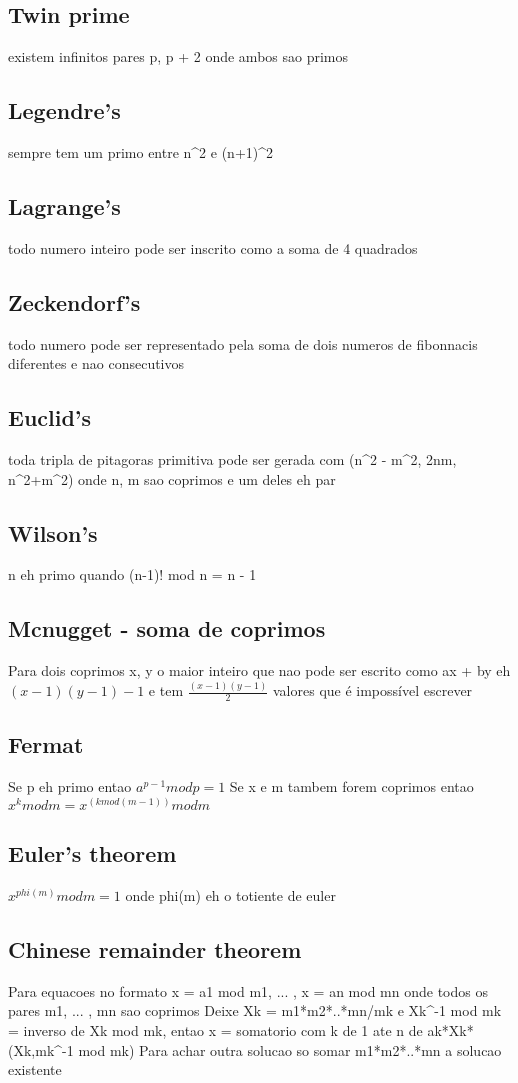 \documentclass{article}
\begin{document}
\subsection{Twin prime} existem infinitos pares p, p + 2 onde ambos sao primos
\subsection{Legendre's} sempre tem um primo entre n^2 e (n+1)^2
\subsection{Lagrange's} todo numero inteiro pode ser inscrito como a soma de 4 quadrados
\subsection{Zeckendorf's} todo numero pode ser representado pela soma de dois numeros de fibonnacis diferentes e nao consecutivos
\subsection{Euclid's} toda tripla de pitagoras primitiva pode ser gerada com 
    (n^2 - m^2, 2nm, n^2+m^2) onde n, m sao coprimos e um deles eh par
\subsection{Wilson's} n eh primo quando (n-1)! mod n = n - 1
\subsection{Mcnugget - soma de coprimos} Para dois coprimos x, y o maior inteiro que nao pode ser escrito como ax + by eh $(x-1)(y-1)-1$ e tem $\frac{(x-1)(y-1)}{2}$ valores que é impossível escrever

\subsection{Fermat} Se p eh primo entao $a^{p-1} mod p = 1$
Se x e m tambem forem coprimos entao $x^k mod m = x^{(k mod(m-1))} mod m$
\subsection{Euler's theorem} $x^{phi(m)} mod m = 1$ onde phi(m) eh o totiente de euler

\subsection{Chinese remainder theorem}
Para equacoes no formato x = a1 mod m1, ... , x = an mod mn onde todos os pares m1, ... , mn sao coprimos
Deixe Xk = m1*m2*..*mn/mk e Xk^-1 mod mk = inverso de Xk mod mk, entao
x = somatorio com k de 1 ate n de ak*Xk*(Xk,mk^-1 mod mk)
Para achar outra solucao so somar m1*m2*..*mn a solucao existente
\end{document}
